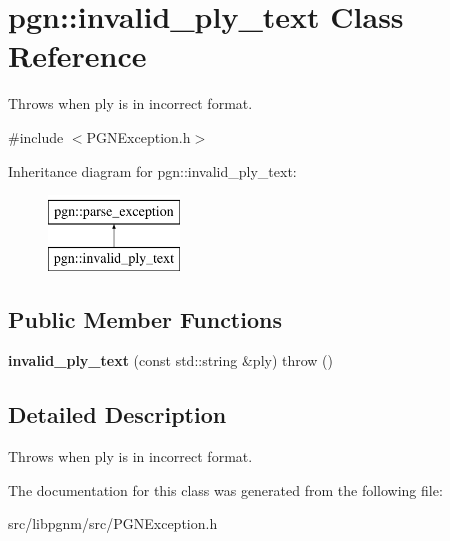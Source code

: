 \hypertarget{classpgn_1_1invalid__ply__text}{
\section{pgn::invalid\_\-ply\_\-text Class Reference}
\label{classpgn_1_1invalid__ply__text}
}


Throws when ply is in incorrect format.  




{\ttfamily \#include $<$PGNException.h$>$}

Inheritance diagram for pgn::invalid\_\-ply\_\-text:\begin{figure}[H]
\begin{center}
\leavevmode
\includegraphics[height=2.000000cm]{classpgn_1_1invalid__ply__text}
\end{center}
\end{figure}
\subsection*{Public Member Functions}
\begin{DoxyCompactItemize}
\item 
\hypertarget{classpgn_1_1invalid__ply__text_ad345e8ac55e74e272c3a6f59611b7a94}{
{\bfseries invalid\_\-ply\_\-text} (const std::string \&ply)  throw ()}
\label{classpgn_1_1invalid__ply__text_ad345e8ac55e74e272c3a6f59611b7a94}

\end{DoxyCompactItemize}


\subsection{Detailed Description}
Throws when ply is in incorrect format. 

The documentation for this class was generated from the following file:\begin{DoxyCompactItemize}
\item 
src/libpgnm/src/PGNException.h\end{DoxyCompactItemize}
